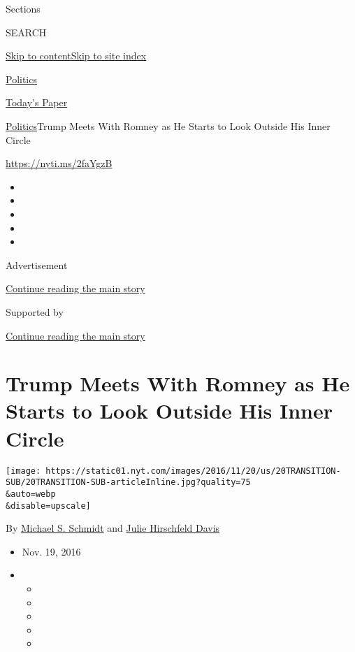 Sections

SEARCH

\protect\hyperlink{site-content}{Skip to
content}\protect\hyperlink{site-index}{Skip to site index}

\href{https://www.nytimes.com/section/politics}{Politics}

\href{https://myaccount.nytimes.com/auth/login?response_type=cookie\&client_id=vi}{}

\href{https://www.nytimes.com/section/todayspaper}{Today's Paper}

\href{/section/politics}{Politics}\textbar{}Trump Meets With Romney as
He Starts to Look Outside His Inner Circle

\url{https://nyti.ms/2faYgzB}

\begin{itemize}
\item
\item
\item
\item
\item
\end{itemize}

Advertisement

\protect\hyperlink{after-top}{Continue reading the main story}

Supported by

\protect\hyperlink{after-sponsor}{Continue reading the main story}

\hypertarget{trump-meets-with-romney-as-he-starts-to-look-outside-his-inner-circle}{%
\section{Trump Meets With Romney as He Starts to Look Outside His Inner
Circle}\label{trump-meets-with-romney-as-he-starts-to-look-outside-his-inner-circle}}

\texttt{[image: https://static01.nyt.com/images/2016/11/20/us/20TRANSITION-SUB/20TRANSITION-SUB-articleInline.jpg?quality=75\\\&auto=webp\\\&disable=upscale]}

By \href{http://www.nytimes.com/by/michael-s-schmidt}{Michael S.
Schmidt} and
\href{https://www.nytimes.com/by/julie-hirschfeld-davis}{Julie
Hirschfeld Davis}

\begin{itemize}
\item
  Nov. 19, 2016
\item
  \begin{itemize}
  \item
  \item
  \item
  \item
  \item
  \end{itemize}
\end{itemize}

